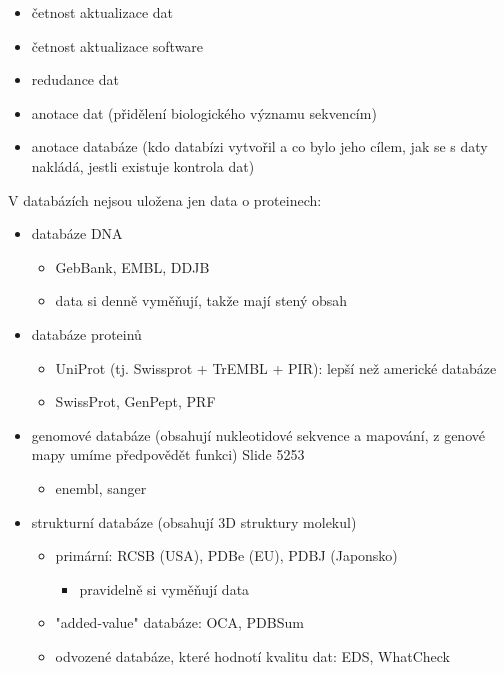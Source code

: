 \documentclass[DIV=8]{scrreprt}
\begin{document}
\begin{itemize}
    \item četnost aktualizace dat
    \item četnost aktualizace software
    \item redudance dat
    \item anotace dat (přidělení biologického významu sekvencím)
    \item anotace databáze (kdo databízi vytvořil a co bylo jeho cílem, jak se s daty nakládá, jestli existuje kontrola dat)
\end{itemize}


V databázích nejsou uložena jen data o proteinech:
\begin{itemize}
    \item databáze DNA
\begin{itemize}
    \item GebBank, EMBL, DDJB
    \item data si denně vyměňují, takže mají stený obsah
\end{itemize}

    \item databáze proteinů
\begin{itemize}
    \item UniProt (tj. Swissprot + TrEMBL + PIR): lepší než americké databáze
    \item SwissProt, GenPept, PRF
\end{itemize}

    \item genomové databáze (obsahují nukleotidové sekvence a mapování, z genové mapy umíme předpovědět funkci) Slide 5253
\begin{itemize}
    \item enembl, sanger
\end{itemize}

    \item strukturní databáze (obsahují 3D struktury molekul)
\begin{itemize}
    \item primární: RCSB (USA), PDBe (EU), PDBJ (Japonsko)
\begin{itemize}
    \item pravidelně si vyměňují data
\end{itemize}

    \item "added-value" databáze: OCA, PDBSum
    \item odvozené databáze, které hodnotí kvalitu dat: EDS, WhatCheck
\end{itemize}

\end{itemize}
\end{document}
